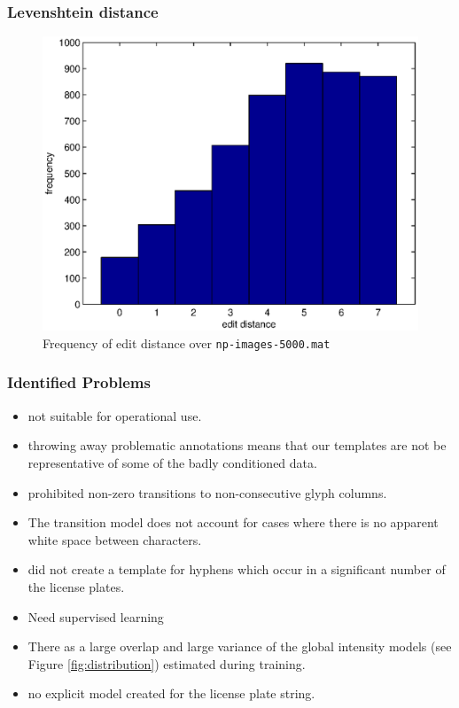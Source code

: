 \documentclass{beamer}
\begin{document}
\begin{frame}
  \frametitle{Levenshtein distance}
  \begin{figure}
\begin{center}
\includegraphics[width=0.75\linewidth]{pics/hamming.eps}
\caption{ Frequency of edit distance over \texttt{np-images-5000.mat}  } 
\label{fig:editdistance}
\end{center}
\end{figure}
\end{frame}

\begin{frame}
  \frametitle{Identified Problems}
\begin{itemize}
\item not suitable for operational use.
\item throwing away problematic annotations means that our templates
  are not be representative of some of the badly conditioned data.
\item prohibited non-zero transitions to non-consecutive glyph
  columns.
\item The transition model does not account for cases where there is
  no apparent white space between characters.
\item did not create a template for hyphens which occur in a
  significant number of the license plates.
\item Need supervised learning
\item There as a large overlap and large variance of the global
  intensity models (see Figure \ref{fig:distribution}) estimated
  during training.
\item no explicit model created for the license plate string.
\end{itemize}
\end{frame}
\end{document}
